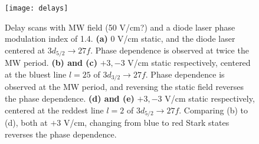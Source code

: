 \documentclass{article}
\begin{document}
\begin{figure}
	\texttt{[image: delays]}
	\caption{Delay scans with MW field (50 V/cm?) and a diode laser phase modulation index of 1.4.
	\textbf{(a)} 0 V/cm static, and the diode laser centered at $3d_{5/2} \rightarrow 27f$. Phase dependence is observed at twice the MW period.
	\textbf{(b) and (c)} $+3, -3$ V/cm static respectively, centered at the bluest line $l=25$ of $3d_{3/2} \rightarrow 27f$. Phase dependence is observed at the MW period, and reversing the static field reverses the phase dependence.
	\textbf{(d) and (e)} $+3, -3$ V/cm static respectively, centered at the reddest line $l=2$ of $3d_{5/2} \rightarrow 27f$. Comparing (b) to (d), both at $+3$ V/cm, changing from blue to red Stark states reverses the phase dependence.}
	\label{fig:del}
\end{figure}
\end{document}
